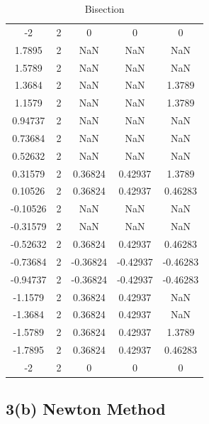 \documentclass[11pt]{article}
\newcommand{\1}{\mathbbm{1}}
\begin{document}
\begin{table}[h]
\begin{tabular}{c c c c c }
		-2  &         2  &         0 &          0  &         0\\
		1.7895  &         2  &       NaN &        NaN  &       NaN\\
		1.5789  &         2  &       NaN &        NaN  &       NaN\\
		1.3684  &         2  &       NaN &        NaN  &    1.3789\\
		1.1579  &         2  &       NaN &        NaN  &    1.3789\\
		0.94737  &         2  &       NaN &        NaN  &       NaN\\
		0.73684  &         2  &       NaN &        NaN  &       NaN\\
		0.52632  &         2  &       NaN &        NaN  &       NaN\\
		0.31579  &         2  &   0.36824 &    0.42937  &    1.3789\\
		0.10526  &         2  &   0.36824 &    0.42937  &   0.46283\\
		-0.10526  &         2  &       NaN &        NaN  &       NaN\\
		-0.31579  &         2  &       NaN &        NaN  &       NaN\\
		-0.52632  &         2  &   0.36824 &    0.42937  &   0.46283\\
		-0.73684  &         2  &  -0.36824 &   -0.42937  &  -0.46283\\
		-0.94737  &         2  &  -0.36824 &   -0.42937  &  -0.46283\\
		-1.1579  &         2  &   0.36824 &    0.42937  &       NaN\\
		-1.3684  &         2  &   0.36824 &    0.42937  &       NaN\\
		-1.5789  &         2  &   0.36824 &    0.42937  &    1.3789\\
		-1.7895  &         2  &   0.36824 &    0.42937  &   0.46283\\
		-2  &         2  &         0 &          0  &         0\\
		\hline
		\hline
	\end{tabular} 
	\caption{Bisection}
	\label{tab:3:1}
\end{table}

\subsection*{3(b) Newton Method}
\end{document}
